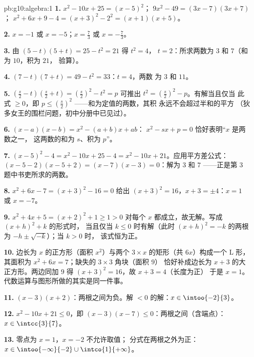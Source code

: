 \begin{solution}{pb:g10:algebra:1}
\textbf{1.} $x^2 - 10x + 25 = (x - 5)^2$；
$9x^2 - 49 = (3x - 7)(3x + 7)$；
$x^2 + 6x + 9 - 4 = (x + 3)^2 - 2^2 = (x + 1)(x + 5)$。

\textbf{2.} $x = -1$ 或 $x = -5$；\quad $x = \frac73$ 或
$x = -\frac73$。

\textbf{3.} 由 $(5 - t)(5 + t) = 25 - t^2 = 21$ 得 $t^2 = 4$，
$t = 2$：所求两数为 $3$ 和 $7$（和为 $10$，积为 $21$，
验算）。

\textbf{4.} $(7 - t)(7 + t) = 49 - t^2 = 33$：$t = 4$，两数
为 $3$ 和 $11$。

\textbf{5.} $\left(\frac s2 - t\right)\left(\frac s2 + t\right)
= \left(\frac s2\right)^2 - t^2 = p$ 可推出
$t^2 = \left(\frac s2\right)^2 - p$。有解当且仅当
此式 $\geq 0$，即
$p \leq \left(\frac s2\right)^2$ ——和为定值的两数，其积
永远不会超过半和的平方
（狄多女王的围栏问题，初中分册中已见过）。

\textbf{6.} $(x - a)(x - b) = x^2 - (a + b)x + ab$：
$x^2 - sx + p = 0$ 恰好表明“$x$ 是两数之一，
这两数的和为 $s$、积为 $p$”。

\textbf{7.} $(x-5)^2 - 4 = x^2 - 10x + 25 - 4 = x^2 - 10x +
21$。应用平方差公式：
$(x - 5 - 2)(x - 5 + 2) = (x - 7)(x - 3) = 0$：解为 $3$
和 $7$ ——正是第 3 题中书吏所求的两数。

\textbf{8.} $x^2 + 6x - 7 = (x + 3)^2 - 16 = 0$ 给出
$(x + 3)^2 = 16$，$x + 3 = \pm 4$：$x = 1$ 或 $x = -7$。

\textbf{9.} $x^2 + 4x + 5 = (x + 2)^2 + 1 \geq 1 > 0$ 对每个
$x$ 都成立，故无解。写成 $(x + h)^2 + k$ 的形式时，
当且仅当 $k \leq 0$ 时有解（此时 $(x+h)^2 = -k$ 的两根
为 $-h \pm \sqrt{-k}$）；当 $k > 0$ 时，
该式恒为正。

\textbf{10.} 边长为 $x$ 的正方形（面积 $x^2$）与两个
$3 \times x$ 的矩形（共 $6x$）构成一个 L 形，其面积为
$x^2 + 6x = 7$；缺失的 $3 \times 3$ 角块（面积 $9$）
恰好补成边长为 $x + 3$ 的大正方形。两边同加 $9$
得 $(x + 3)^2 = 16$，故 $x + 3 = 4$（长度为正）
于是 $x = 1$。代数运算与图形所做的其实是同一件事。

\textbf{11.} $(x-3)(x+2)$：两根之间为负。解
$< 0$ 的解：$x \in \intoo{-2}{3}$。

\textbf{12.} $x^2 - 10x + 21 \leq 0$，即
$(x - 3)(x - 7) \leq 0$：两根之间（含端点）：
$x \in \intcc{3}{7}$。

\textbf{13.} 零点为 $x = 1$，$x = -2$ 不允许取值；
分式在两根之外为正：
$x \in \intoo{-\infty}{-2} \cup \intco{1}{+\infty}$。


\end{solution}
